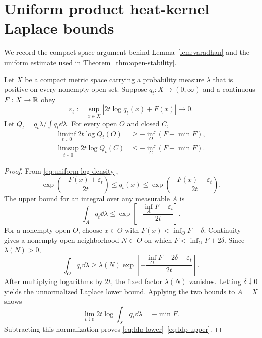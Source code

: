\section{Uniform product heat-kernel Laplace bounds}
\label{app:laplace}

We record the compact-space argument behind Lemma~\ref{lem:varadhan} and the
uniform estimate used in Theorem~\ref{thm:open-stability}.

\begin{lemma}\label{lem:compact-laplace}
Let $X$ be a compact metric space carrying a probability measure $\lambda$
that is positive on every nonempty open set.  Suppose $q_t:X\to(0,\infty)$
and a continuous $F:X\to\mathbb R$ obey
\begin{equation}\label{eq:uniform-log-density}
 \varepsilon_t:=\sup_{x\in X}|2t\log q_t(x)+F(x)|\longrightarrow0.
\end{equation}
Let $Q_t=q_t\lambda/\int q_t\dd\lambda$.  For every open $O$ and closed $C$,
\begin{align}
 \liminf_{t\downarrow0}2t\log Q_t(O)
 &\geq-\inf_O(F-\min F),\label{eq:ldp-lower}\\
 \limsup_{t\downarrow0}2t\log Q_t(C)
 &\leq-\inf_C(F-\min F).\label{eq:ldp-upper}
\end{align}
\end{lemma}

\begin{proof}
From \eqref{eq:uniform-log-density},
\begin{equation}\label{eq:exponential-sandwich}
 \exp\left(-\frac{F(x)+\varepsilon_t}{2t}\right)
 \leq q_t(x)\leq
 \exp\left(-\frac{F(x)-\varepsilon_t}{2t}\right).
\end{equation}
The upper bound for an integral over any measurable $A$ is
\[
 \int_Aq_t\dd\lambda
 \leq \exp\left[-\frac{\inf_AF-\varepsilon_t}{2t}\right].
\]
For a nonempty open $O$, choose $x\in O$ with
$F(x)<\inf_OF+\delta$.  Continuity gives a nonempty open neighborhood
$N\subset O$ on which $F<\inf_OF+2\delta$.  Since $\lambda(N)>0$,
\[
 \int_Oq_t\dd\lambda
 \geq\lambda(N)
 \exp\left[-\frac{\inf_OF+2\delta+\varepsilon_t}{2t}\right].
\]
After multiplying logarithms by $2t$, the fixed factor $\lambda(N)$
vanishes.  Letting $\delta\downarrow0$ yields the unnormalized Laplace lower
bound.  Applying the two bounds to $A=X$ shows
\[
 \lim_{t\downarrow0}2t\log\int_Xq_t\dd\lambda=-\min F.
\]
Subtracting this normalization proves
\eqref{eq:ldp-lower}--\eqref{eq:ldp-upper}.
\end{proof}


